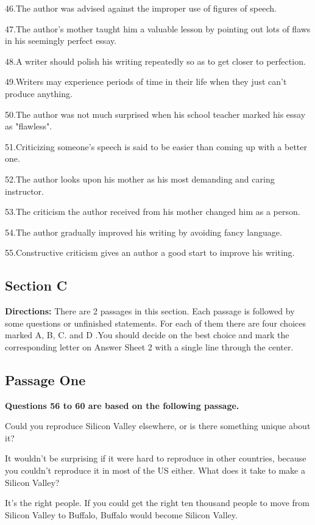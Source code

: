 \documentclass[UTF8,11pt]{ctexart}
\begin{document}
46.The author was advised against the improper use of figures of speech.


47.The author's mother taught him a valuable lesson by pointing out lots of flaws in his seemingly perfect essay.


48.A writer should polish his writing repeatedly so as to get closer to perfection.


49.Writers may experience periods of time in their life when they just can't produce anything.


50.The author was not much surprised when his school teacher marked his essay as "flawless".


51.Criticizing someone's speech is said to be easier than coming up with a better one.


52.The author looks upon his mother as his most demanding and caring instructor.


53.The criticism the author received from his mother changed him as a person.


54.The author gradually improved his writing by avoiding fancy language.


55.Constructive criticism gives an author a good start to improve his writing.


\subsection*{\textbf{Section C}}


\textbf{Directions:} There are 2 passages in this section. Each passage is followed by some questions or unfinished statements. For each of them there are four choices marked A, B, C. and D .You should decide on the best choice and mark the corresponding letter on Answer Sheet 2 with a single line through the center.


\subsection*{\textbf{Passage One}}


\textbf{Questions 56 to 60 are based on the following passage.}


Could you reproduce Silicon Valley elsewhere, or is there something unique about it?


It wouldn't be surprising if it were hard to reproduce in other countries, because you couldn't reproduce it in most of the US either. What does it take to make a Silicon Valley?


It's the right people. If you could get the right ten thousand people to move from Silicon Valley to Buffalo, Buffalo would become Silicon Valley.
\end{document}
